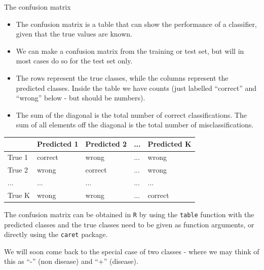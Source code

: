 \documentclass[10pt,ignorenonframetext,]{beamer}
\begin{document}
\begin{frame}

\begin{block}{The confusion matrix}

\vspace{2mm}

\begin{itemize}
\item
  The confusion matrix is a table that can show the performance of a
  classifier, given that the true values are known.
\item
  We can make a confusion matrix from the training or test set, but will
  in most cases do so for the test set only.
\item
  The rows represent the true classes, while the columns represent the
  predicted classes. Inside the table we have counts (just labelled
  ``correct'' and ``wrong'' below - but should be numbers).
\item
  The sum of the diagonal is the total number of correct
  classifications. The sum of all elements off the diagonal is the total
  number of misclassifications.
\end{itemize}

\begin{center}

\begin{tabular}{l|l|l|l|l}
\hline
 & Predicted 1 & Predicted 2 & ... & Predicted K\\
\hline
True 1 & correct & wrong & ... & wrong\\
\hline
True 2 & wrong & correct & ... & wrong\\
\hline
... & ... & ... & ... & ...\\
\hline
True K & wrong & wrong & ... & correct\\
\hline
\end{tabular}
\end{center}

\end{block}

\end{frame}

\begin{frame}[fragile]

The confusion matrix can be obtained in \texttt{R} by using the
\texttt{table} function with the predicted classes and the true classes
need to be given as function arguments, or directly using the
\texttt{caret} package.

We will soon come back to the special case of two classes - where we may
think of this as ``-'' (non disease) and ``+'' (disease).

\end{frame}
\end{document}
